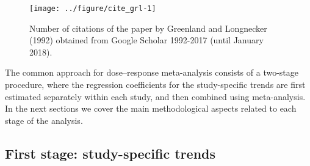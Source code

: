 \documentclass[11pt,a4paper,twoside,openany]{book}\usepackage{knitr}
\begin{document}
{\begin{knitrout}\footnotesize
{}\color{fgcolor}\begin{figure}[ht!]

{\centering \texttt{[image: ../figure/cite\_grl-1]} 

}

\caption[Number of citations of the paper by Greenland and Longnecker (1992) obtained from Google Scholar 1992-2017 (until January 2018)]{Number of citations of the paper by Greenland and Longnecker (1992) obtained from Google Scholar 1992-2017 (until January 2018).}\label{fig:cite_grl}
\end{figure}


\end{knitrout}

The common approach for dose--response meta-analysis consists of a two-stage procedure, where the regression coefficients for the study-specific trends are first estimated separately within each study, and then combined using meta-analysis. In the next sections we cover the main methodological aspects related to each stage of the analysis.


\subsection{First stage: study-specific trends}\label{sec:1st_stage}

}
\end{document}
